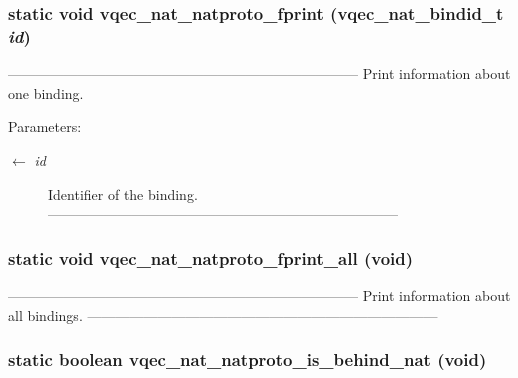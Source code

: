 \subsubsection{\setlength{\rightskip}{0pt plus 5cm}static void vqec\_\-nat\_\-natproto\_\-fprint (vqec\_\-nat\_\-bindid\_\-t {\em id})\hspace{0.3cm}{\tt  [static]}}\label{vqec__nat__natproto_8c_85cc060628dba4c9d147591e0eb2e585}


--------------------------------------------------------------------------- Print information about one binding.

\begin{Desc}
\item[Parameters:]
\begin{description}
\item[\mbox{$\leftarrow$} {\em id}]Identifier of the binding. --------------------------------------------------------------------------- \end{description}
\end{Desc}
\subsubsection{\setlength{\rightskip}{0pt plus 5cm}static void vqec\_\-nat\_\-natproto\_\-fprint\_\-all (void)\hspace{0.3cm}{\tt  [static]}}\label{vqec__nat__natproto_8c_2cb781ee67e91efef461e2c6ee4fa9d3}


--------------------------------------------------------------------------- Print information about all bindings. --------------------------------------------------------------------------- 
\subsubsection{\setlength{\rightskip}{0pt plus 5cm}static boolean vqec\_\-nat\_\-natproto\_\-is\_\-behind\_\-nat (void)\hspace{0.3cm}{\tt  [static]}}\label{vqec__nat__natproto_8c_67cb233d67c5800aba47c7bd69ec3926}


